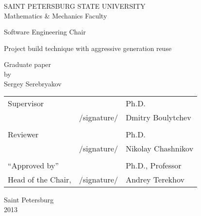 %
%
\thispagestyle{empty}
\begin{center}
SAINT PETERSBURG STATE UNIVERSITY\\
Mathematics \& Mechanics Faculty\\
\end{center}

\begin{center}
Software Engineering Chair\\
\end{center}
\vspace{2cm}
\begin{center}
    \LARGE{Project build technique with aggressive generation reuse} \\
\end{center}
\vspace{1cm}
\begin{center}
    \normalsize{Graduate paper} \\
	\normalsize{by} \\
    \large{Sergey Serebryakov}
\end{center}
\vspace{3cm}
\noindent
\begin{center}
    \small
    \begin{tabular}{lcl}
        Supervisor & \dotuline{\phantom{место для подписи}} & Ph.D.\\
        & /signature/ & Dmitry Boulytchev\\\\
        Reviewer & \dotuline{\phantom{место для подписи}} & Ph.D.\\
        & /signature/& Nikolay Chashnikov\\\\
        ``Approved by'' & \dotuline{\phantom{место для подписи}} & Ph.D., Professor\\
        Head of the Chair, & /signature/& Andrey Terekhov\\
    \end{tabular}
\end{center}
\vspace{\fill}
\begin{center}
    \small
    Saint Petersburg\\2013
\end{center}
